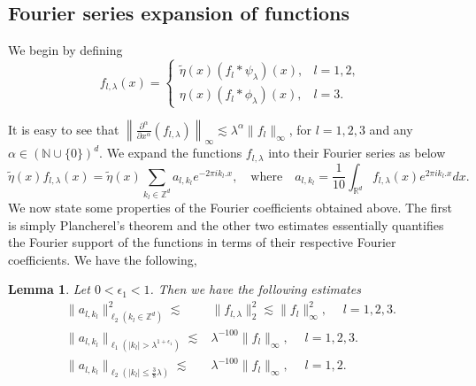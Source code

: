 \documentclass[a4paper,reqno]{amsart}
\newcommand{\R}{{\mathbb R}}       %
\newcommand{\N}{{\mathbb N}}
\newcommand{\Z}{{\mathbb Z}}
\newtheorem{lemma}[theorem]{Lemma}
\theoremstyle{definition}
\numberwithin{equation}{section}
\begin{document}
\subsection{Fourier series expansion of functions} We begin by defining
\[f_{l,\lambda}(x)=\begin{cases}\widetilde\eta(x)(f_l*\psi_\lambda)(x),&l=1,2,\\\eta(x)(f_l*\phi_\lambda)(x),&l=3.\end{cases}\]

It is easy to see that $\left\|\frac{\partial^\alpha}{\partial x^\alpha} (f_{l,\lambda})\right\|_\infty\lesssim\lambda^{\alpha}\|f_l\|_\infty$, for $l=1,2,3$ and any $\alpha\in(\N\cup\{0\})^d$. We expand the functions $f_{l,\lambda}$ into their Fourier series as below
\begin{equation*}
	\widetilde\eta(x) f_{l,\lambda}(x)=\widetilde\eta(x)\sum_{k_l\in\Z^d}a_{l,k_l}e^{-2\pi i k_l.x},\quad\text{where}\quad a_{l,k_l}=\frac{1}{10}\int_{\R^d}f_{l,\lambda}(x)e^{2\pi i k_l.x}dx.
\end{equation*}
We now state some properties of the Fourier coefficients obtained above. The first is simply Plancherel's theorem and the other two estimates essentially quantifies the Fourier support of the functions in terms of their respective Fourier coefficients. We have the following,
\begin{lemma}\label{lemma:Fouriercoeff}
	Let $0<\epsilon_1<1$. Then we have the following estimates
	\begin{align}
		\|a_{l,k_l}\|_{\ell_2(k_l\in\Z^d)}^2\lesssim&\|f_{l,\lambda}\|_2^2\lesssim\|f_l\|_\infty^2,\quad\;l=1,2,3.\label{est:FourierBessel}\\
		\|a_{l,k_l}\|_{\ell_1(|k_l|>\lambda^{1+\epsilon_1})}\lesssim&\lambda^{-100}\|f_l\|_\infty,\quad\;l=1,2,3.\label{est:Fouriertail}\\
		\|a_{l,k_l}\|_{\ell_2(|k_l|\leq\frac{3}{8}\lambda)}\lesssim&\lambda^{-100}\|f_l\|_\infty,\quad\;l=1,2.\label{est:Fouriermain}
	\end{align}
\end{lemma}
\end{document}
